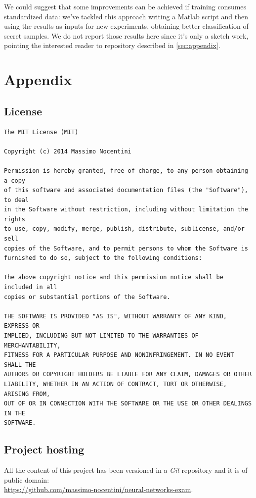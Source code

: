 \documentclass[10pt,a4paper]{article}
\begin{document}
    We could suggest that some improvements can be achieved if training consumes standardized
    data: we've tackled this approach writing a Matlab script 
    and then using the results as inputs for new experiments, obtaining better classification
    of secret samples. We do not report those results here since it's only a sketch work, 
    pointing the interested reader to  repository described in \autoref{sec:appendix}.


    \newpage

    \section{Appendix}
    \label{sec:appendix}

    \subsection{License}
\begin{verbatim}
The MIT License (MIT)

Copyright (c) 2014 Massimo Nocentini

Permission is hereby granted, free of charge, to any person obtaining a copy
of this software and associated documentation files (the "Software"), to deal
in the Software without restriction, including without limitation the rights
to use, copy, modify, merge, publish, distribute, sublicense, and/or sell
copies of the Software, and to permit persons to whom the Software is
furnished to do so, subject to the following conditions:

The above copyright notice and this permission notice shall be included in all
copies or substantial portions of the Software.

THE SOFTWARE IS PROVIDED "AS IS", WITHOUT WARRANTY OF ANY KIND, EXPRESS OR
IMPLIED, INCLUDING BUT NOT LIMITED TO THE WARRANTIES OF MERCHANTABILITY,
FITNESS FOR A PARTICULAR PURPOSE AND NONINFRINGEMENT. IN NO EVENT SHALL THE
AUTHORS OR COPYRIGHT HOLDERS BE LIABLE FOR ANY CLAIM, DAMAGES OR OTHER
LIABILITY, WHETHER IN AN ACTION OF CONTRACT, TORT OR OTHERWISE, ARISING FROM,
OUT OF OR IN CONNECTION WITH THE SOFTWARE OR THE USE OR OTHER DEALINGS IN THE
SOFTWARE.
\end{verbatim}

    \subsection{Project hosting}
    All the content of this project has been versioned in a \emph{Git} repository and 
    it is of public domain:\\
    \url{https://github.com/massimo-nocentini/neural-networks-exam}.\\
\end{document}
